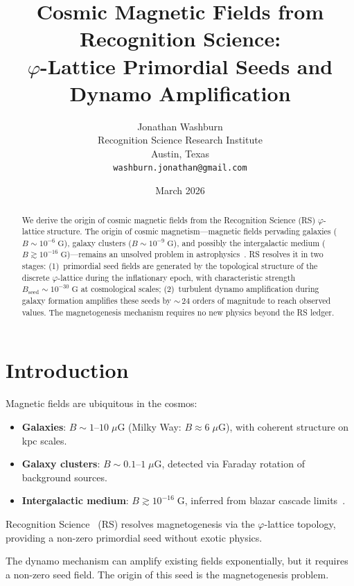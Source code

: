 \documentclass[12pt,a4paper]{article}
\title{Cosmic Magnetic Fields from Recognition Science:\\
$\varphi$-Lattice Primordial Seeds and Dynamo Amplification}
\author{Jonathan Washburn\\
Recognition Science Research Institute\\
Austin, Texas\\
\texttt{washburn.jonathan@gmail.com}}
\date{March 2026}
\theoremstyle{definition}
\theoremstyle{remark}
\begin{document}
\maketitle

\begin{abstract}
We derive the origin of cosmic magnetic fields from the Recognition
Science (RS) $\varphi$-lattice structure.  The origin of cosmic
magnetism---magnetic fields pervading galaxies
($B \sim 10^{-6}\;\mathrm{G}$), galaxy clusters
($B \sim 10^{-9}\;\mathrm{G}$), and possibly the intergalactic
medium ($B \gtrsim 10^{-16}\;\mathrm{G}$)---remains an unsolved
problem in astrophysics~\cite{Durrer2013}.  RS resolves it in two
stages: (1)~primordial seed fields are generated by the topological
structure of the discrete $\varphi$-lattice during the inflationary
epoch, with characteristic strength
$B_{\mathrm{seed}} \sim 10^{-30}\;\mathrm{G}$ at cosmological
scales; (2)~turbulent dynamo amplification during galaxy formation
amplifies these seeds by ${\sim}\,24$ orders of magnitude to reach
observed values.  The magnetogenesis mechanism requires no new
physics beyond the RS ledger.
\end{abstract}

\section{Introduction}
\label{sec:intro}

Magnetic fields are ubiquitous in the cosmos:
\begin{itemize}
  \item \textbf{Galaxies}: $B \sim 1$--$10\;\mu\mathrm{G}$
  (Milky Way: $B \approx 6\;\mu\mathrm{G}$), with coherent
  structure on kpc scales.
  \item \textbf{Galaxy clusters}: $B \sim 0.1$--$1\;\mu\mathrm{G}$,
  detected via Faraday rotation of background sources.
  \item \textbf{Intergalactic medium}: $B \gtrsim 10^{-16}\;
  \mathrm{G}$, inferred from blazar cascade
  limits~\cite{Neronov2010}.
\end{itemize}

Recognition Science~\cite{RS_Axioms} (RS) resolves magnetogenesis
via the $\varphi$-lattice topology, providing a non-zero primordial
seed without exotic physics.

The dynamo mechanism can amplify existing fields exponentially, but
it requires a non-zero seed field.  The origin of this seed is the
magnetogenesis problem.
\end{document}
